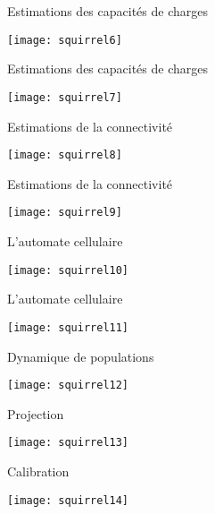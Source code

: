 \documentclass[]{beamer}
\begin{document}
 
 \begin{frame}{Estimations des capacités de charges}
\begin{center}
  \texttt{[image: squirrel6]}
\end{center}
 \end{frame}

\begin{frame}{Estimations des capacités de charges}
\begin{center}
  \texttt{[image: squirrel7]}
\end{center}
 \end{frame}

 
 \begin{frame}{Estimations de la connectivité}
\begin{center}
  \texttt{[image: squirrel8]}
\end{center}
 \end{frame}

 
 \begin{frame}{Estimations de la connectivité}
\begin{center}
  \texttt{[image: squirrel9]}
\end{center}
 \end{frame}

 
 \begin{frame}{L'automate cellulaire}
\begin{center}
  \texttt{[image: squirrel10]}
\end{center}
 \end{frame}

 
 \begin{frame}{L'automate cellulaire}
\begin{center}
  \texttt{[image: squirrel11]}
\end{center}
 \end{frame}

 
 \begin{frame}{Dynamique de populations}
\begin{center}
  \texttt{[image: squirrel12]}
\end{center}
 \end{frame}

 
 \begin{frame}{Projection}
\begin{center}
  \texttt{[image: squirrel13]}
\end{center}
 \end{frame}
\begin{frame}{Calibration}
\begin{center}
  \texttt{[image: squirrel14]}
\end{center}
 \end{frame}
\end{document}
